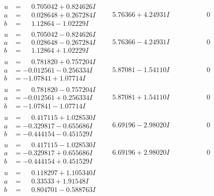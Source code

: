 \documentclass[1p]{elsarticle_modified}
\theoremstyle{definition}
\begin{document}
$$\begin{array}{c|c|c}
\begin{aligned}
u &= \phantom{-}0.705042 + 0.824626 I \\
a &= \phantom{-}0.028648 + 0.267284 I \\
b &= \phantom{-}1.12864 - 1.02229 I\end{aligned}
 & \phantom{-}5.76366 + 4.24931 I & \phantom{-0.000000 } 0 \\ \hline\begin{aligned}
u &= \phantom{-}0.705042 - 0.824626 I \\
a &= \phantom{-}0.028648 - 0.267284 I \\
b &= \phantom{-}1.12864 + 1.02229 I\end{aligned}
 & \phantom{-}5.76366 - 4.24931 I & \phantom{-0.000000 } 0 \\ \hline\begin{aligned}
u &= \phantom{-}0.781820 + 0.757204 I \\
a &= -0.012561 - 0.256334 I \\
b &= -1.07841 + 1.07714 I\end{aligned}
 & \phantom{-}5.87081 - 1.54110 I & \phantom{-0.000000 } 0 \\ \hline\begin{aligned}
u &= \phantom{-}0.781820 - 0.757204 I \\
a &= -0.012561 + 0.256334 I \\
b &= -1.07841 - 1.07714 I\end{aligned}
 & \phantom{-}5.87081 + 1.54110 I & \phantom{-0.000000 } 0 \\ \hline\begin{aligned}
u &= \phantom{-}0.417115 + 1.028530 I \\
a &= -0.329817 - 0.655686 I \\
b &= -0.444154 - 0.451529 I\end{aligned}
 & \phantom{-}6.69196 - 2.98020 I & \phantom{-0.000000 } 0 \\ \hline\begin{aligned}
u &= \phantom{-}0.417115 - 1.028530 I \\
a &= -0.329817 + 0.655686 I \\
b &= -0.444154 + 0.451529 I\end{aligned}
 & \phantom{-}6.69196 + 2.98020 I & \phantom{-0.000000 } 0 \\ \hline\begin{aligned}
u &= \phantom{-}0.118297 + 1.105340 I \\
a &= \phantom{-}0.33533 + 1.91548 I \\
b &= \phantom{-}0.804701 - 0.588763 I\end{aligned}

\end{array}$$
\end{document}
